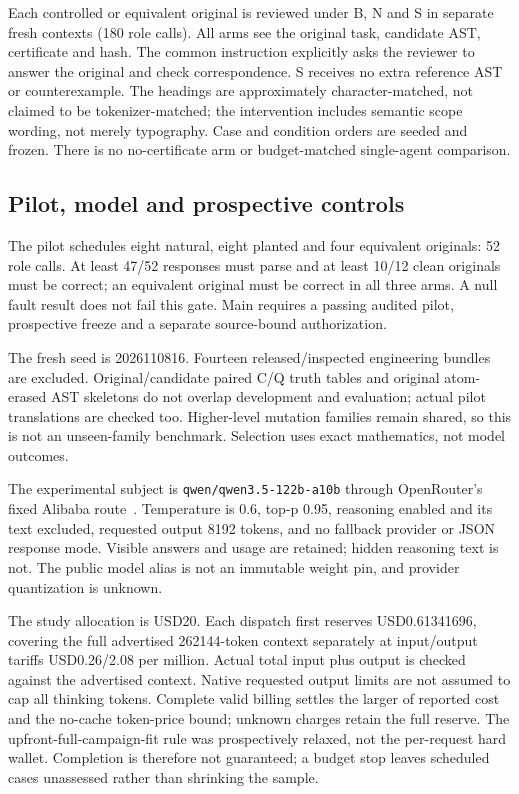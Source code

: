 \documentclass[10pt]{article}
\newcommand{\code}[1]{\texttt{#1}}
\begin{document}
Each controlled or equivalent original is reviewed under B, N and S in separate
fresh contexts (180 role calls). All arms see the original task, candidate AST,
certificate and hash. The common instruction explicitly asks the reviewer to
answer the original and check correspondence. S receives no extra reference AST
or counterexample. The headings are approximately character-matched, not claimed
to be tokenizer-matched; the intervention includes semantic scope wording, not
merely typography. Case and condition orders are seeded and frozen. There is no
no-certificate arm or budget-matched single-agent comparison.

\subsection{Pilot, model and prospective controls}
The pilot schedules eight natural, eight planted and four equivalent originals:
52 role calls. At least 47/52 responses must parse and at least 10/12 clean
originals must be correct; an equivalent original must be correct in all three
arms. A null fault result does not fail this gate. Main requires a passing
audited pilot, prospective freeze and a separate source-bound authorization.

The fresh seed is 2026110816. Fourteen released/inspected engineering bundles
are excluded. Original/candidate paired C/Q truth tables and original atom-erased
AST skeletons do not overlap development and evaluation; actual pilot translations
are checked too. Higher-level mutation families remain shared, so this is not
an unseen-family benchmark. Selection uses exact mathematics, not model outcomes.

The experimental subject is \code{qwen/qwen3.5-122b-a10b} through OpenRouter's
fixed Alibaba route~\cite{qwen,openrouter}. Temperature is 0.6, top-p 0.95,
reasoning enabled and its text excluded, requested output 8192 tokens, and no
fallback provider or JSON response mode. Visible answers and usage are retained;
hidden reasoning text is not. The public model alias is not an immutable weight
pin, and provider quantization is unknown.

The study allocation is USD20. Each dispatch first reserves USD0.61341696,
covering the full advertised 262144-token context separately at input/output
tariffs USD0.26/2.08 per million. Actual total input plus output is checked against
the advertised context. Native requested output limits are not assumed to cap
all thinking tokens. Complete valid billing settles the larger of reported cost
and the no-cache token-price bound; unknown charges retain the full reserve.
The upfront-full-campaign-fit rule was prospectively relaxed, not the per-request
hard wallet. Completion is therefore not guaranteed; a budget stop leaves
scheduled cases unassessed rather than shrinking the sample.
\end{document}
